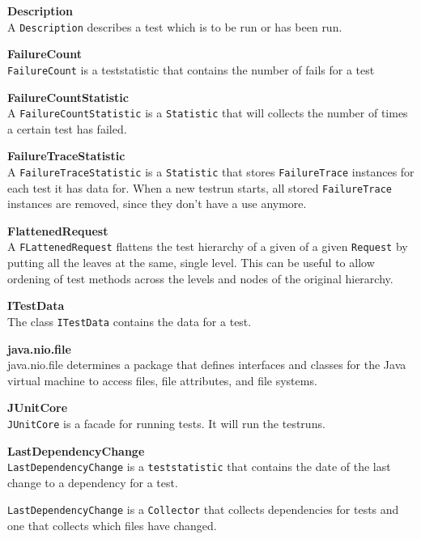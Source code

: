 \documentclass[i2]{oss}
\newcommand{\class}[1]{\texttt{#1}}
\newcommand{\gloss}[1]{\textbf{#1}}
\begin{document}
\begin{description}
\item \gloss{Description} \\ A \class{Description} describes a test which is to be run or has been run. 

\item \gloss{FailureCount} \\ 
\class{FailureCount} is a teststatistic that contains the number of fails for a test

\item \gloss{FailureCountStatistic}\\
A \class{FailureCountStatistic} is a \class{Statistic} that will collects the number of times a certain test has failed.

\item \gloss{FailureTraceStatistic}\\
A \class{FailureTraceStatistic} is a \class{Statistic} that stores \class{FailureTrace} instances for each test it has data for. When a new testrun starts, all stored \class{FailureTrace} instances are removed, since they don't have a use anymore.
	

\item \gloss{FlattenedRequest}\\
A \class{FLattenedRequest} flattens the test hierarchy of a given of a given \class{Request} by putting all the leaves at the same, single level. This can be useful to allow ordening of test methods across the levels and nodes of the original hierarchy.

\item \gloss{ITestData} \\
The class \class{ITestData} contains the data for a test.

\item \gloss{java.nio.file} \\
java.nio.file determines a package that defines interfaces and classes for the Java virtual machine to access files, file attributes, and file systems.

\item \gloss{JUnitCore} \\
\class{JUnitCore} is a facade for running tests. It will run the testruns.

\item \gloss{LastDependencyChange} \\
\class{LastDependencyChange} is a \class{teststatistic} that contains the date of the last change to a dependency for a test.

\class{LastDependencyChange} is a \class{Collector} that collects dependencies for tests and one that collects which files have changed.


\end{description}
\end{document}
